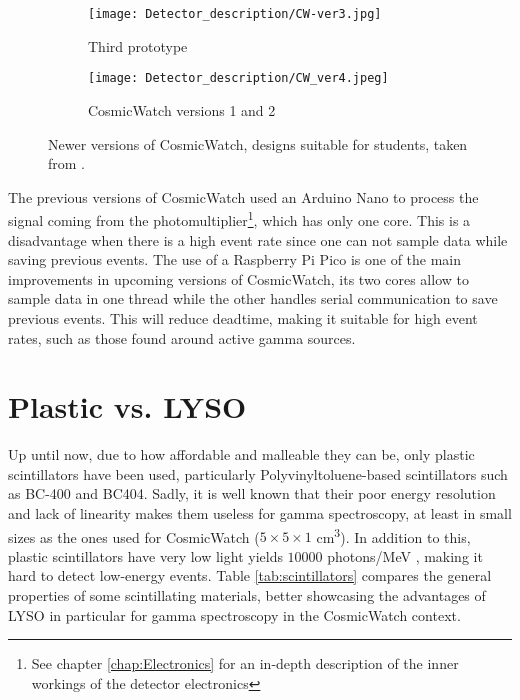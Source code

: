\begin{figure}[H]
  \centering
  \begin{subfigure}[t]{0.45\textwidth}
    \texttt{[image: Detector\_description/CW-ver3.jpg]}
    \caption{\label{sfig:CW_ver3} Third prototype}
  \end{subfigure}
  \begin{subfigure}[t]{0.45\textwidth}
    \texttt{[image: Detector\_description/CW\_ver4.jpeg]}
    \caption{\label{sfig:CW_ver4} CosmicWatch versions 1 and 2}
  \end{subfigure}
  \caption{\label{fig:CW_ver3_ver4}Newer versions of CosmicWatch, designs suitable for students, taken from \cite{CosmicWatch}.}
\end{figure}

The previous versions of CosmicWatch used an Arduino Nano to process the signal coming from the photomultiplier\footnote{See chapter \ref{chap:Electronics} for an in-depth description of the inner workings of the detector electronics}, which has only one core. This is a disadvantage when there is a high event rate since one can not sample data while saving previous events. The use of a Raspberry Pi Pico is one of the main improvements in upcoming versions of CosmicWatch, its two cores allow to sample data in one thread while the other handles serial communication to save previous events. This will reduce deadtime, making it suitable for high event rates, such as those found around active gamma sources.

\section{Plastic vs. LYSO}

Up until now, due to how affordable and malleable they can be, only plastic scintillators have been used, particularly Polyvinyltoluene-based scintillators such as BC-400 and BC404. Sadly, it is well known that their poor energy resolution and lack of linearity makes them useless for gamma spectroscopy, at least in small sizes as the ones used for CosmicWatch ($5\times5\times1$ \unit{\cm\cubed}). In addition to this, plastic scintillators have very low light yields $10000$ photons/MeV \cite{mukhopadhyay2004plastic}, making it hard to detect low-energy events. Table \ref{tab:scintillators} compares the general properties of some scintillating materials, better showcasing the advantages of LYSO in particular for gamma spectroscopy in the CosmicWatch context.

